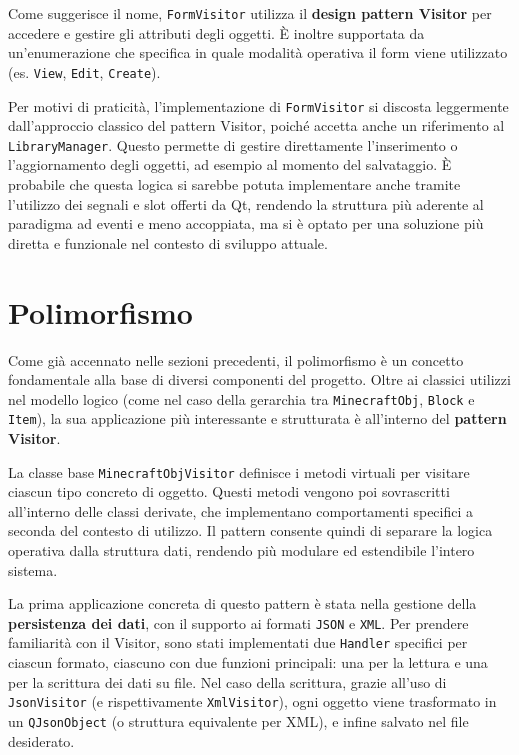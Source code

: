 \documentclass[a4paper,12pt]{article}
\begin{document}
Come suggerisce il nome, \texttt{FormVisitor} utilizza il \textbf{design pattern Visitor} per accedere e gestire gli attributi degli oggetti.  
È inoltre supportata da un’enumerazione che specifica in quale modalità operativa il form viene utilizzato (es. \texttt{View}, \texttt{Edit}, \texttt{Create}).

Per motivi di praticità, l’implementazione di \texttt{FormVisitor} si discosta leggermente dall’approccio classico del pattern Visitor, poiché accetta anche un riferimento al \texttt{LibraryManager}.  
Questo permette di gestire direttamente l’inserimento o l’aggiornamento degli oggetti, ad esempio al momento del salvataggio.  
È probabile che questa logica si sarebbe potuta implementare anche tramite l’utilizzo dei segnali e slot offerti da Qt, rendendo la struttura più aderente al paradigma ad eventi e meno accoppiata, ma si è optato per una soluzione più diretta e funzionale nel contesto di sviluppo attuale.

\section{Polimorfismo}
\label{sec:polimorfismo}

Come già accennato nelle sezioni precedenti, il polimorfismo è un concetto fondamentale alla base di diversi componenti del progetto.  
Oltre ai classici utilizzi nel modello logico (come nel caso della gerarchia tra \texttt{MinecraftObj}, \texttt{Block} e \texttt{Item}), la sua applicazione più interessante e strutturata è all'interno del \textbf{pattern Visitor}.

La classe base \texttt{MinecraftObjVisitor} definisce i metodi virtuali per visitare ciascun tipo concreto di oggetto. Questi metodi vengono poi sovrascritti all'interno delle classi derivate, che implementano comportamenti specifici a seconda del contesto di utilizzo.  
Il pattern consente quindi di separare la logica operativa dalla struttura dati, rendendo più modulare ed estendibile l’intero sistema.

La prima applicazione concreta di questo pattern è stata nella gestione della \textbf{persistenza dei dati}, con il supporto ai formati \texttt{JSON} e \texttt{XML}.  
Per prendere familiarità con il Visitor, sono stati implementati due \texttt{Handler} specifici per ciascun formato, ciascuno con due funzioni principali: una per la lettura e una per la scrittura dei dati su file.  
Nel caso della scrittura, grazie all’uso di \texttt{JsonVisitor} (e rispettivamente \texttt{XmlVisitor}), ogni oggetto viene trasformato in un \texttt{QJsonObject} (o struttura equivalente per XML), e infine salvato nel file desiderato.
\end{document}
